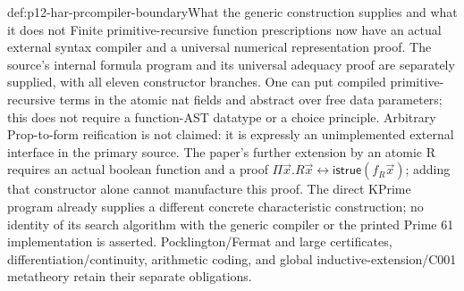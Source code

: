 \begin{proofboundary}{def:p12-har-prcompiler-boundary}{What the generic construction supplies and what it does not}
Finite primitive-recursive function prescriptions now have an actual
external syntax compiler and a universal numerical representation proof.
The source's internal formula program and its universal adequacy proof
are separately supplied, with all eleven constructor branches. One can
put compiled primitive-recursive terms in the atomic nat fields and
abstract over free data parameters; this does not require a function-AST
datatype or a choice principle. Arbitrary Prop-to-form reification is not
claimed: it is expressly an unimplemented external interface in the
primary source. The paper's further extension by an atomic R requires
an actual boolean function and a proof
\(\Pi\vec x.R\vec x\leftrightarrow\mathsf{istrue}(f_R\vec x)\);
adding that constructor alone cannot manufacture this proof.
The direct KPrime program already supplies a different concrete
characteristic construction; no identity of its search algorithm with
the generic compiler or the printed Prime 61 implementation is asserted.
Pocklington/Fermat and large certificates, differentiation/continuity,
arithmetic coding, and global inductive-extension/C001 metatheory retain
their separate obligations.
\end{proofboundary}
